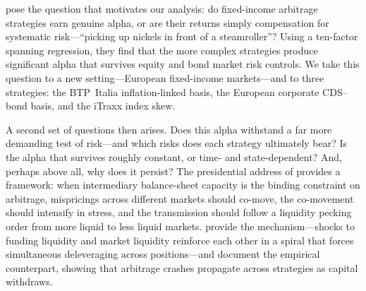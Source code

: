 
\citet{duarte2007risk} pose the question that motivates our analysis:
do fixed-income arbitrage strategies earn genuine alpha, or are their
returns simply compensation for systematic risk---``picking up nickels
in front of a steamroller''? Using a ten-factor spanning regression,
they find that the more complex strategies produce significant alpha
that survives equity and bond market risk controls. We take this
question to a new setting---European fixed-income markets---and to
three strategies: the BTP~Italia inflation-linked basis,
the European corporate CDS--bond basis, and the iTraxx index skew.

A second set of questions then arises. Does this alpha withstand a far
more demanding test of risk---and which risks does each strategy
ultimately bear? Is the alpha that survives roughly constant, or time-
and state-dependent? And, perhaps above all, why does it persist? The
presidential address of \citet{duffie2010presidential} provides a
framework: when intermediary balance-sheet capacity is the binding
constraint on arbitrage, mispricings across different markets should
co-move, the co-movement should intensify in stress, and the
transmission should follow a liquidity pecking order from more liquid
to less liquid markets. \citet{brunnermeier2009market} provide the
mechanism---shocks to funding liquidity and market liquidity reinforce
each other in a spiral that forces simultaneous deleveraging across
positions---and \citet{mitchell2012arbitrage} document the empirical
counterpart, showing that arbitrage crashes propagate across strategies
as capital withdraws.

